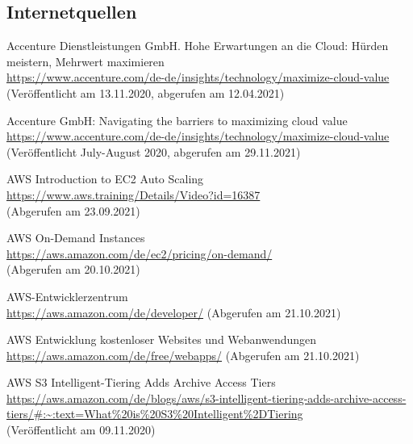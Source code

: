 \subsection*{Internetquellen}
\begin{thebibliography}{HR08} %
  Accenture Dienstleistungen GmbH. Hohe Erwartungen an die Cloud: Hürden meistern, Mehrwert maximieren \\
  \url{https://www.accenture.com/de-de/insights/technology/maximize-cloud-value}\\
  (Veröffentlicht am 13.11.2020, abgerufen am 12.04.2021)
  
  Accenture GmbH: Navigating the barriers to maximizing cloud value\\
  \url{https://www.accenture.com/de-de/insights/technology/maximize-cloud-value}\\
  (Veröffentlicht July-August 2020, abgerufen am 29.11.2021)

  AWS Introduction to EC2 Auto Scaling\\
  \url{https://www.aws.training/Details/Video?id=16387}\\
  (Abgerufen am 23.09.2021)

  AWS On-Demand Instances \\
  \url{https://aws.amazon.com/de/ec2/pricing/on-demand/}\\
  (Abgerufen am 20.10.2021)

  AWS-Entwicklerzentrum \\
  \url{https://aws.amazon.com/de/developer/}
  (Abgerufen am 21.10.2021)

  AWS Entwicklung kostenloser Websites
  und Webanwendungen   \\
  \url{https://aws.amazon.com/de/free/webapps/}
  (Abgerufen am 21.10.2021)


   AWS S3 Intelligent-Tiering Adds Archive Access Tiers \\
  \url{https://aws.amazon.com/de/blogs/aws/s3-intelligent-tiering-adds-archive-access-tiers/#:~:text=What%20is%20S3%20Intelligent%2DTiering}\\
  (Veröffentlicht am 09.11.2020)


\end{thebibliography}
